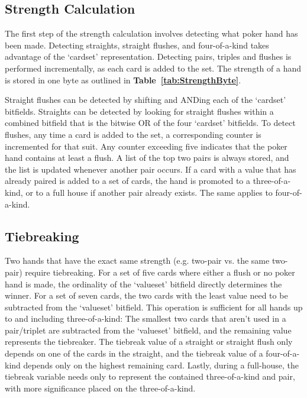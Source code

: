 \subsection{Strength Calculation}
\label{sec:StrengthCalculation}

The first step of the strength calculation involves detecting what poker hand has been made.
Detecting straights, straight flushes, and four-of-a-kind takes advantage of the `cardset' representation.
Detecting pairs, triples and flushes is performed incrementally, as each card is added to the set.
The strength of a hand is stored in one byte as outlined in \textbf{Table~\ref{tab:StrengthByte}}.

Straight flushes can be detected by shifting and ANDing each of the `cardset' bitfields.
Straights can be detected by looking for straight flushes within a combined bitfield that is the bitwise OR of the four `cardset' bitfields.
To detect flushes, any time a card is added to the set, a corresponding counter is incremented for that suit.
Any counter exceeding five indicates that the poker hand contains at least a flush.
A list of the top two pairs is always stored, and the list is updated whenever another pair occurs.
If a card with a value that has already paired is added to a set of cards, the hand is promoted to a three-of-a-kind, or to a full house if another pair already exists.
The same applies to four-of-a-kind.


\subsection{Tiebreaking}
\label{sec:Tiebreaking}
Two hands that have the exact same strength (e.g. two-pair vs. the same two-pair) require tiebreaking.
For a set of five cards where either a flush or no poker hand is made, the ordinality of the `valueset' bitfield directly determines the winner.
For a set of seven cards, the two cards with the least value need to be subtracted from the `valueset' bitfield.
This operation is sufficient for all hands up to and including three-of-a-kind: The smallest two cards that aren't used in a pair/triplet are subtracted from the `valueset' bitfield, and the remaining value represents the tiebreaker.
The tiebreak value of a straight or straight flush only depends on one of the cards in the straight, and the tiebreak value of a four-of-a-kind depends only on the highest remaining card.
Lastly, during a full-house, the tiebreak variable needs only to represent the contained three-of-a-kind and pair, with more significance placed on the three-of-a-kind.


